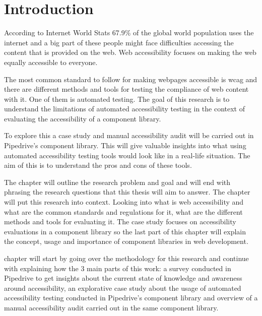 \documentclass{master_thesis}
\begin{document}
\section{Introduction} \label{chap:intro}

According to Internet World Stats 67.9\% of the global world population uses the internet \citep{MMG2023} and a big part of these people might face difficulties accessing the content that is provided on the web. Web accessibility focuses on making the web equally accessible to everyone.


The most common standard to follow for making webpages accessible is \ac{wcag} and there are different methods and tools for testing the compliance of web content with it. One of them is automated testing. The goal of this research is to understand the limitations of automated accessibility testing in the context of evaluating the accessibility of a component library.


To explore this a case study and manual accessibility audit will be carried out in Pipedrive's component library. This will give valuable insights into what using automated accessibility testing tools would look like in a real-life situation. The aim of this is to understand the pros and cons of these tools.


The  chapter will outline the research problem and goal and will end with phrasing the research questions that this thesis will aim to answer. The  chapter will put this research into context. Looking into what is web accessibility and what are the common standards and regulations for it, what are the different methods and tools for evaluating it. The case study focuses on accessibility evaluations in a component library so the last part of this chapter will explain the concept, usage and importance of component libraries in web development.

 chapter will start by going over the methodology for this research and continue with explaining how the 3 main parts of this work: a survey conducted in Pipedrive to get insights about the current state of knowledge and awareness around accessibility, an explorative case study about the usage of automated accessibility testing conducted in Pipedrive's component library and overview of a manual accessibility audit carried out in the same component library.
\end{document}
